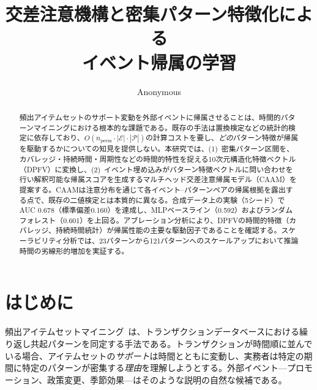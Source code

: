 \documentclass[sigconf,nonacm]{acmart}
\begin{document}
\title{交差注意機構と密集パターン特徴化による\\イベント帰属の学習}

\author{Anonymous}

\begin{abstract}
頻出アイテムセットのサポート変動を外部イベントに帰属させることは、時間的パターンマイニングにおける根本的な課題である。既存の手法は置換検定などの統計的検定に依存しており、$O(n_{\text{perm}} \cdot |\mathcal{E}| \cdot |\mathcal{P}|)$の計算コストを要し、\emph{どの}パターン特徴が帰属を駆動するかについての知見を提供しない。本研究では、(1)~密集パターン区間を、カバレッジ・持続時間・周期性などの時間的特性を捉える10次元構造化特徴ベクトル（DPFV）に変換し、(2)~イベント埋め込みがパターン特徴ベクトルに問い合わせを行い解釈可能な帰属スコアを生成するマルチヘッド交差注意帰属モデル（CAAM）を提案する。CAAMは注意分布を通じて各イベント--パターンペアの帰属根拠を露出する点で、既存の二値検定とは本質的に異なる。合成データ上の実験（5シード）でAUC 0.678（標準偏差0.160）を達成し、MLPベースライン（0.592）およびランダムフォレスト（0.601）を上回る。アブレーション分析により、DPFVの時間的特徴（カバレッジ、持続時間統計）が帰属性能の主要な駆動因子であることを確認する。スケーラビリティ分析では、23パターンから121パターンへのスケールアップにおいて推論時間の劣線形的増加を実証する。
\end{abstract}


\maketitle

\section{はじめに}
\label{sec:introduction}

頻出アイテムセットマイニング~\cite{agrawal1994fast,han2004mining}は、トランザクションデータベースにおける繰り返し共起パターンを同定する手法である。トランザクションが時間順に並んでいる場合、アイテムセットの\emph{サポート}は時間とともに変動し、実務者は特定の期間に特定のパターンが密集する\emph{理由}を理解しようとする。外部イベント---プロモーション、政策変更、季節効果---はそのような説明の自然な候補である。
\end{document}
